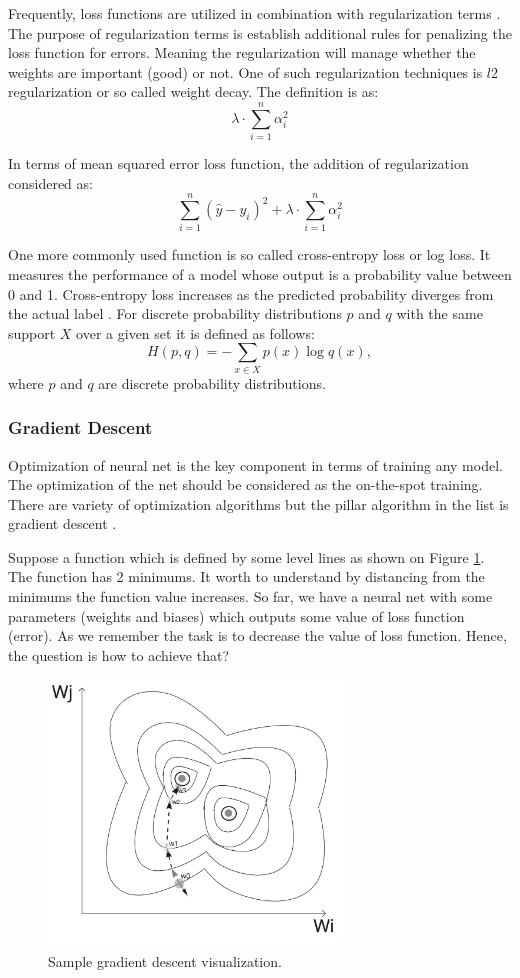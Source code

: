 Frequently, loss functions are utilized in combination with regularization terms \cite{Chen2019}. The purpose of regularization terms is establish additional rules for penalizing the loss function for errors. Meaning the regularization will manage whether the weights are important (good) or not. One of such regularization techniques is $l2$ regularization or so called weight decay. The definition is as:
\[ \lambda \cdot \sum_{i=1}^{n} \alpha_i^2 \]

In terms of mean squared error loss function, the addition of regularization considered as:
\[ \sum_{i=1}^n(\hat{y}-y_i)^2 + \lambda \cdot \sum_{i=1}^{n} \alpha_i^2\]

One more commonly used function is so called cross-entropy loss or log loss. It measures the performance of a model whose output is a probability value between 0 and 1. Cross-entropy loss increases as the predicted probability diverges from the actual label \cite{Boudiaf2020}. For discrete probability distributions $p$ and $q$ with the same support $X$ over a given set it is defined as follows:
\[H(p,q) = - \sum_{x \in X} p(x) \log q(x), \]
where $p$ and $q$ are discrete probability distributions. 

\subsubsection{Gradient Descent}
Optimization of neural net is the key component in terms of training any model. The optimization of the net should be considered as the on-the-spot training. There are variety of optimization algorithms but the pillar algorithm in the list is gradient descent \cite{Zou2020}.

Suppose a function which is defined by some level lines as shown on Figure \ref{fig:gradient}. The function has 2 minimums. It worth to understand by distancing from the minimums the function value increases. 
So far, we have a neural net with some parameters (weights and biases) which outputs some value of loss function (error). As we remember the task is to decrease the value of loss function. Hence, the question is how to achieve that? 

\begin{figure}[h]
    \centering \includegraphics[width=8cm]{images/gradient_descent.jpeg}
    \caption {Sample gradient descent visualization.}
    \label{fig:gradient}
\end{figure}

